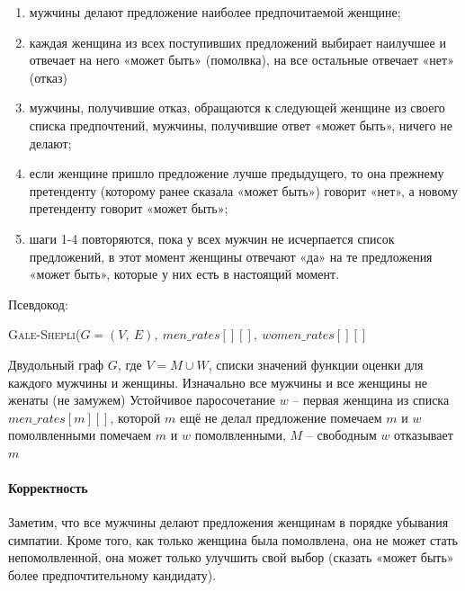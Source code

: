 \documentclass[a4paper,12pt]{article}
\newcommand{\algname}[1]{\textsc{#1}}
\begin{document}
\begin{enumerate}
    \item мужчины делают предложение наиболее предпочитаемой женщине;
    \item каждая женщина из всех поступивших предложений выбирает наилучшее и отвечает на него «может быть» (помолвка), на все остальные отвечает «нет» (отказ)
    \item мужчины, получившие отказ, обращаются к следующей женщине из своего списка предпочтений, мужчины, получившие ответ «может быть», ничего не делают;
    \item если женщине пришло предложение лучше предыдущего, то она прежнему претенденту (которому ранее сказала «может быть») говорит «нет», а новому претенденту говорит «может быть»;
    \item шаги 1-4 повторяются, пока у всех мужчин не исчерпается список предложений, в этот момент женщины отвечают «да» на те предложения «может быть», которые у них есть в настоящий момент.
\end{enumerate}

Псевдокод:

\begin{algorithm}
  	\caption{\algname{Gale-Shepli}($G = (V,\ E),\ men\_rates[][],\ women\_rates[][]$}
	\begin{algorithmic}
	    \Require Двудольный граф $G$, где $V = M \cup W$, списки значений функции оценки для каждого мужчины и женщины. Изначально все мужчины и все женщины не женаты (не замужем)
	    \Ensure Устойчивое паросочетание
	    \State 
	        \State $w$ -- первая женщина из списка $men\_rates[m][]$, которой $m$ ещё не делал предложение
	            \State помечаем $m$ и $w$ помолвленными
	            \State помечаем $m$ и $w$ помолвленными, $M$ -- свободным
	        \Else 
	            \State $w$ отказывает $m$
	\end{algorithmic}
\end{algorithm}

\paragraph{Корректность}

Заметим, что все мужчины делают предложения женщинам в порядке убывания симпатии. Кроме того, как только женщина была помолвлена, она не может стать непомолвленной, она может только улучшить свой выбор (сказать «может быть» более предпочтительному кандидату).
\end{document}
